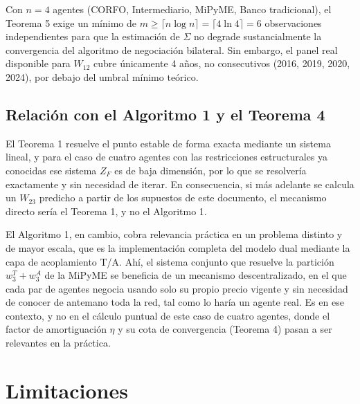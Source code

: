 Con $n=4$ agentes (CORFO, Intermediario, MiPyME, Banco tradicional), el Teorema 5 exige un mínimo de $m \geq \lceil n\log n\rceil = \lceil 4\ln 4\rceil = 6$ observaciones independientes para que la estimación de $\Sigma$ no degrade sustancialmente la convergencia del algoritmo de negociación bilateral. Sin embargo, el panel real disponible para $W_{12}$ cubre únicamente 4 años, no consecutivos (2016, 2019, 2020, 2024), por debajo del umbral mínimo teórico.

\subsection{Relación con el Algoritmo 1 y el Teorema 4}

El Teorema 1 resuelve el punto estable de forma exacta mediante un sistema lineal, y para el caso de cuatro agentes con las restricciones estructurales ya conocidas ese sistema $Z_F$ es de baja dimensión, por lo que se resolvería exactamente y sin necesidad de iterar. En consecuencia, si más adelante se calcula un $W_{23}$ predicho a partir de los supuestos de este documento, el mecanismo directo sería el Teorema 1, y no el Algoritmo 1.

El Algoritmo 1, en cambio, cobra relevancia práctica en un problema distinto y de mayor escala, que es la implementación completa del modelo dual mediante la capa de acoplamiento T/A. Ahí, el sistema conjunto que resuelve la partición $w_3^T + w_3^A$ de la MiPyME se beneficia de un mecanismo descentralizado, en el que cada par de agentes negocia usando solo su propio precio vigente y sin necesidad de conocer de antemano toda la red, tal como lo haría un agente real. Es en ese contexto, y no en el cálculo puntual de este caso de cuatro agentes, donde el factor de amortiguación $\eta$ y su cota de convergencia (Teorema 4) pasan a ser relevantes en la práctica.

\section{Limitaciones}
\label{sec:limitaciones}

